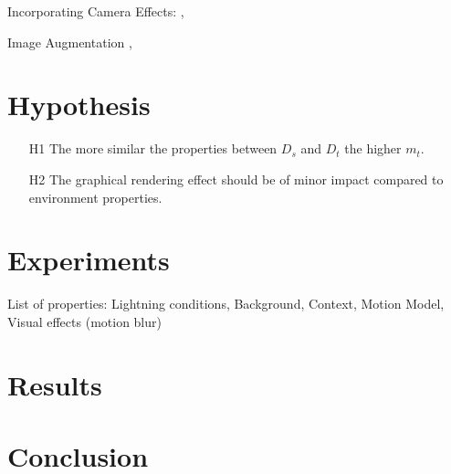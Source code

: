 Incorporating Camera Effects:
\cite{Carlson2018},\cite{Vass}

Image Augmentation
 \cite{Bai2017},
 
\section{Hypothesis}
\label{sec:training:hypothesis}

\begin{enumerate}
	\item[H1] The more similar the properties between $D_s$ and $D_t$ the higher $m_t$.
	\item[H2] The graphical rendering effect should be of minor impact compared to environment properties.
\end{enumerate}




\section{Experiments}
\label{sec:training:experiments}

List of properties: Lightning conditions, Background, Context, Motion Model, Visual effects (motion blur)


\section{Results}
\label{sec:training:results}

\section{Conclusion}
\label{sec:training:conclusion}



